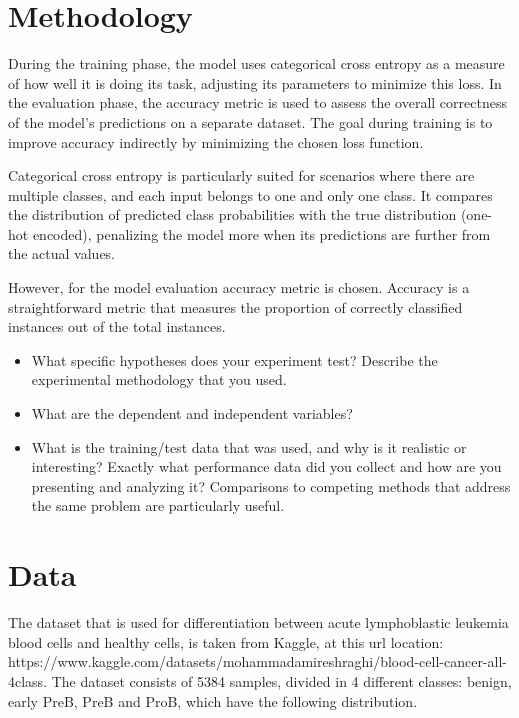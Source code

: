 \documentclass[runningheads,a4paper,11pt]{report}
\begin{document}
\section{Methodology}
\label{section:methodology}

During the training phase, the model uses categorical cross entropy as a measure of how well it is doing its task, adjusting its parameters to minimize this loss. In the evaluation phase, the accuracy metric is used to assess the overall correctness of the model's predictions on a separate dataset. The goal during training is to improve accuracy indirectly by minimizing the chosen loss function. 

Categorical cross entropy is particularly suited for scenarios where there are multiple classes, and each input belongs to one and only one class. It compares the distribution of predicted class probabilities with the true distribution (one-hot encoded), penalizing the model more when its predictions are further from the actual values.

However, for the model evaluation accuracy metric is chosen. Accuracy is a straightforward metric that measures the proportion of correctly classified instances out of the total instances. 

\begin{itemize}
	\item What specific hypotheses does your experiment test? Describe the experimental methodology that you used. 
	\item What are the dependent and independent variables? 
	\item What is the training/test data that was used, and why is it realistic or interesting? Exactly what performance data did you collect and how are you presenting and analyzing it? Comparisons to competing methods that address the same problem are particularly useful.
\end{itemize}

\section{Data}
\label{section:data}
The dataset that is used for differentiation between acute lymphoblastic leukemia blood cells and healthy cells, is taken from Kaggle, at this url location: https://www.kaggle.com/datasets/mohammadamireshraghi/blood-cell-cancer-all-4class. 
The dataset consists of 5384 samples, divided in 4 different classes: benign, early PreB, PreB and ProB, which have the following distribution.
\end{document}
